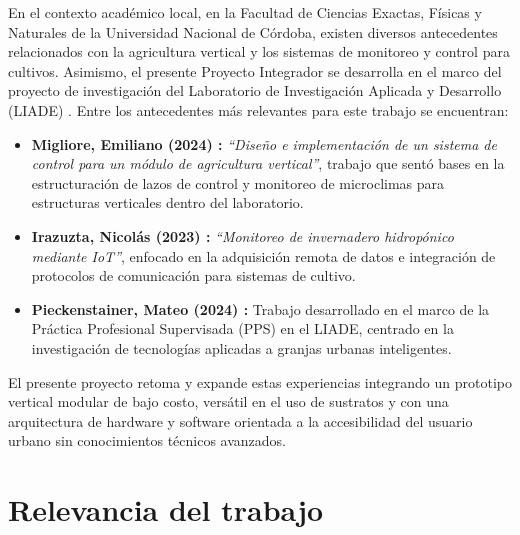 En el contexto académico local, en la Facultad de Ciencias Exactas, Físicas y Naturales de la Universidad Nacional de Córdoba, existen diversos antecedentes relacionados con la agricultura vertical y los sistemas de monitoreo y control para cultivos. Asimismo, el presente Proyecto Integrador se desarrolla en el marco del proyecto de investigación del Laboratorio de Investigación Aplicada y Desarrollo (LIADE) \cite{vanella2023}. Entre los antecedentes más relevantes para este trabajo se encuentran:
\begin{itemize}
    \item \textbf{Migliore, Emiliano (2024) \cite{migliore2024}:} \textit{“Diseño e implementación de un sistema de control para un módulo de agricultura vertical”}, trabajo que sentó bases en la estructuración de lazos de control y monitoreo de microclimas para estructuras verticales dentro del laboratorio.
    \item \textbf{Irazuzta, Nicolás (2023) \cite{irazuzta2023}:} \textit{“Monitoreo de invernadero hidropónico mediante IoT”}, enfocado en la adquisición remota de datos e integración de protocolos de comunicación para sistemas de cultivo.
    \item \textbf{Pieckenstainer, Mateo (2024) \cite{pieckenstainer2024}:} Trabajo desarrollado en el marco de la Práctica Profesional Supervisada (PPS) en el LIADE, centrado en la investigación de tecnologías aplicadas a granjas urbanas inteligentes.
\end{itemize}

El presente proyecto retoma y expande estas experiencias integrando un prototipo vertical modular de bajo costo, versátil en el uso de sustratos y con una arquitectura de hardware y software orientada a la accesibilidad del usuario urbano sin conocimientos técnicos avanzados.

\section{Relevancia del trabajo}
\label{sec:relevancia}

